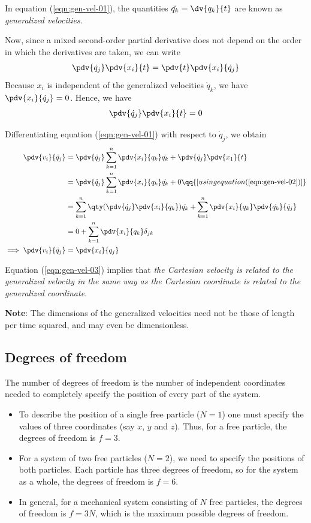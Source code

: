 In equation (\ref{eqn:gen-vel-01}), the quantities $\dot{q_k}=\dv{q_k}{t}$ are known as \textit{generalized velocities}.

Now, since a mixed second-order partial derivative does not depend on the order in which the derivatives are taken, we can write
\begin{align*}
	\pdv{\dot{q}_j}\pdv{x_i}{t}=\pdv{t}\pdv{x_i}{\dot{q}_j}
\end{align*}
Because $x_i$ is independent of the generalized velocities $\dot{q}_k$, we have $\pdv{x_i}{\dot{q}_j}=0$. Hence, we have
\begin{align}
	\pdv{\dot{q}_j}\pdv{x_i}{t}=0 \label{eqn:gen-vel-02}
\end{align}

Differentiating equation (\ref{eqn:gen-vel-01}) with respect to $\dot{q}_j$, we obtain
\begin{align}
	\pdv{v_i}{\dot{q}_j}&=\pdv{\dot{q}_j}\sum_{k=1}^{n}{\pdv{x_i}{q_k}\dot{q_k}}+\pdv{\dot{q}_j}\pdv{x_1}{t} \nonumber\\
	&=\pdv{\dot{q}_j}\sum_{k=1}^{n}{\pdv{x_i}{q_k}\dot{q_k}}+0\qq{[using equation (\ref{eqn:gen-vel-02})]} \nonumber\\
	&=\sum_{k=1}^{n}{\qty(\pdv{\dot{q}_j}\pdv{x_i}{q_k})\dot{q_k}}+\sum_{k=1}^{n}{\pdv{x_i}{q_k}\pdv{\dot{q_k}}{\dot{q}_j}} \nonumber\\
	&=0+\sum_{k=1}^{n}{\pdv{x_i}{q_k}\delta_{jk}} \nonumber\\
	\implies\pdv{v_i}{\dot{q}_j}&=\pdv{x_i}{q_j} \label{eqn:gen-vel-03}
\end{align}

Equation (\ref{eqn:gen-vel-03}) implies that \textit{the Cartesian velocity is related to the generalized velocity in the same way as the Cartesian coordinate is related to the generalized coordinate}.

\textbf{Note}: The dimensions of the generalized velocities need not be those of length per time squared, and may even be dimensionless.

\subsection{Degrees of freedom}
The number of degrees of freedom is the number of independent coordinates needed to completely specify the position of every part of the system.
\begin{itemize}
	\item To describe the position of a single free particle ($N=1$) one must specify the values of three coordinates (say $x$, $y$ and $z$). Thus, for a free particle, the degrees of freedom is $f=3$.
	
	\item For a system of two free particles ($N=2$), we need to specify the positions of both particles. Each particle has three degrees of freedom, so for the system as a whole, the degrees of freedom is $f=6$.
	
	\item In general, for a mechanical system consisting of $N$ free particles, the degrees of freedom is $f=3N$, which is the maximum possible degrees of freedom.
\end{itemize}

